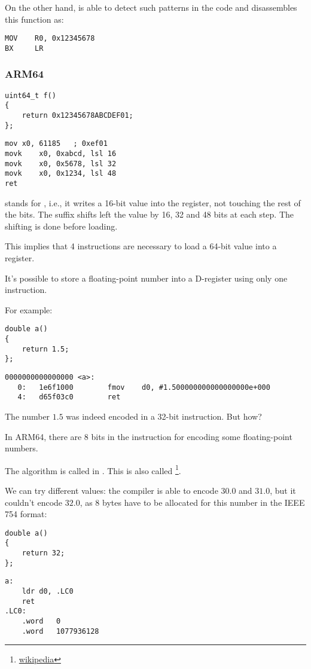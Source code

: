 On the other hand, \IDA is able to detect such patterns in the code and disassembles this function as:

\begin{lstlisting}
MOV    R0, 0x12345678
BX     LR
\end{lstlisting}

\subsubsection{ARM64}

\begin{lstlisting}
uint64_t f()
{
	return 0x12345678ABCDEF01;
};
\end{lstlisting}

\begin{lstlisting}[caption=GCC 4.9.1 -O3]
mov	x0, 61185   ; 0xef01
movk	x0, 0xabcd, lsl 16
movk	x0, 0x5678, lsl 32
movk	x0, 0x1234, lsl 48
ret
\end{lstlisting}

 stands for , i.e., it writes a 16-bit value into the register, not touching the rest of the bits.
The  suffix shifts left the value by 16, 32 and 48 bits at each step. The shifting is done before loading.

This implies that 4 instructions are necessary to load a 64-bit value into a register.


It's possible to store a floating-point number into a D-register using only one instruction.

For example:

\begin{lstlisting}
double a()
{
	return 1.5;
};
\end{lstlisting}

\begin{lstlisting}[caption=GCC 4.9.1 -O3 + objdump]
0000000000000000 <a>:
   0:   1e6f1000        fmov    d0, #1.500000000000000000e+000
   4:   d65f03c0        ret
\end{lstlisting}

The number $1.5$ was indeed encoded in a 32-bit instruction.
But how?

In ARM64, there are 8 bits in the  instruction for encoding some floating-point numbers.

The algorithm is called  in \ARMSixFourRefURL.
This is also called \footnote{\href{http://go.yurichev.com/17139}{wikipedia}}.

We can try different values: the compiler is able to encode $30.0$ and $31.0$, but it couldn't encode $32.0$,
as 8 bytes have to be allocated for this number in the IEEE 754 format:

\begin{lstlisting}
double a()
{
	return 32;
};
\end{lstlisting}

\begin{lstlisting}[caption=GCC 4.9.1 -O3]
a:
	ldr	d0, .LC0
	ret
.LC0:
	.word	0
	.word	1077936128
\end{lstlisting}
